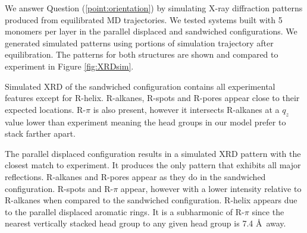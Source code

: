 \documentclass[journal=jpcbfk,manusciprt=article]{achemso}
\begin{document}
  We answer Question (\ref{point:orientation}) by simulating X-ray diffraction
  patterns produced from equilibrated MD trajectories. We tested systems built
  with 5 monomers per layer in the parallel displaced and sandwiched
  configurations. We generated simulated patterns using portions of simulation
  trajectory after equilibration. The patterns for both structures are shown and
  compared to experiment in Figure \ref{fig:XRDsim}.

  Simulated XRD of the sandwiched configuration contains all experimental
  features except for R-helix. R-alkanes, R-spots and R-pores appear close to their
  expected locations. R-$\pi$ is also present, however it intersects R-alkanes at
  a $q_z$ value lower than experiment meaning the head groups in our model prefer 
  to stack farther apart. 

  The parallel displaced configuration results in a simulated XRD pattern with
  the closest match to experiment. It produces the only pattern that exhibits all
  major reflections. R-alkanes and R-pores appear as they do in the sandwiched
  configuration. R-spots and R-$\pi$ appear, however with a lower intensity
  relative to R-alkanes when compared to the sandwiched configuration. R-helix
  appears due to the parallel displaced aromatic rings. It is a subharmonic of
  R-$\pi$ since the nearest vertically stacked head group to any given head group
  is 7.4 \AA~away. 
\end{document}
